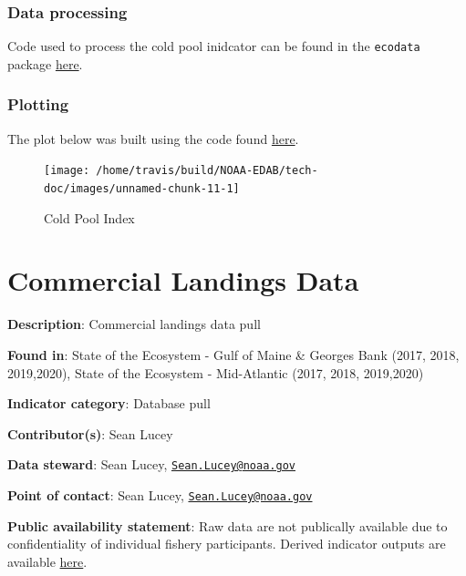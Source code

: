 \documentclass[
]{book}
\begin{document}
\hypertarget{data-processing-7}{%
\subsection{Data processing}\label{data-processing-7}}

Code used to process the cold pool inidcator can be found in the \texttt{ecodata} package \href{https://github.com/NOAA-EDAB/ecodata/blob/master/data-raw/get_cold_pool.R}{here}.

\hypertarget{plotting-6}{%
\subsection{Plotting}\label{plotting-6}}

The plot below was built using the code found
\href{https://github.com/NOAA-EDAB/ecodata/blob/master/chunk-scripts/LTL.Rmd-cold_pool.R}{here}.

\begin{figure}

{\centering \texttt{[image: /home/travis/build/NOAA-EDAB/tech-doc/images/unnamed-chunk-11-1]} 

}

\caption{Cold Pool Index}\label{fig:unnamed-chunk-11}
\end{figure}

\hypertarget{comdat}{%
\chapter{Commercial Landings Data}\label{comdat}}

\textbf{Description}: Commercial landings data pull

\textbf{Found in}: State of the Ecosystem - Gulf of Maine \& Georges Bank (2017, 2018, 2019,2020), State of the Ecosystem - Mid-Atlantic (2017, 2018, 2019,2020)

\textbf{Indicator category}: Database pull

\textbf{Contributor(s)}: Sean Lucey

\textbf{Data steward}: Sean Lucey, \href{mailto:Sean.Lucey@noaa.gov}{\nolinkurl{Sean.Lucey@noaa.gov}}

\textbf{Point of contact}: Sean Lucey, \href{mailto:Sean.Lucey@noaa.gov}{\nolinkurl{Sean.Lucey@noaa.gov}}

\textbf{Public availability statement}: Raw data are not publically available due to confidentiality of individual fishery participants. Derived indicator outputs are
available \href{https://comet.nefsc.noaa.gov/erddap/tabledap/group_landings_soe_v1.html}{here}.
\end{document}
